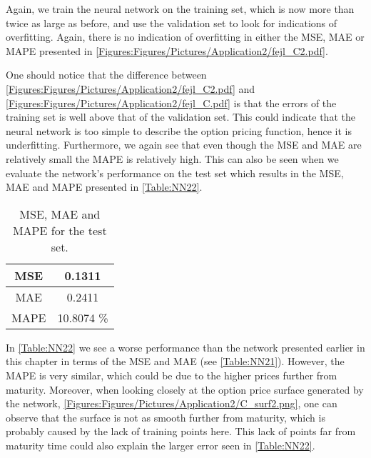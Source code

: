 Again, we train the neural network on the training set, which is now more than twice as large as before, and use the validation set to look for indications of overfitting. Again, there is no indication of overfitting in either the MSE, MAE or MAPE presented in \autoref{Figures:Figures/Pictures/Application2/fejl_C2.pdf}.


One should notice that the difference between \autoref{Figures:Figures/Pictures/Application2/fejl_C2.pdf} and \autoref{Figures:Figures/Pictures/Application2/fejl_C.pdf} is that the errors of the training set is well above that of the validation set. This could indicate that the neural network is too simple to describe the option pricing function, hence it is underfitting. Furthermore, we again see that even though the MSE and MAE are relatively small the MAPE is relatively high. This can also be seen when we evaluate the network's performance on the test set which results in the MSE, MAE and MAPE presented in \autoref{Table:NN22}.

\begin{table}[H]
    \centering
    {\renewcommand{\arraystretch}{1.25}\begin{tabular}{c|c}
        MSE  &  0.1311\\ \hline
        MAE  &  0.2411\\ \hline
        MAPE &  10.8074  \%\\ 
    \end{tabular}}
    \caption{MSE, MAE and MAPE for the test set.}
    \label{Table:NN22}
\end{table}

In \autoref{Table:NN22} we see a worse performance than the network presented earlier in this chapter in terms of the MSE and MAE (see \autoref{Table:NN21}). However, the MAPE is very similar, which could be due to the higher prices further from maturity. Moreover, when looking closely at the option price surface generated by the network, \autoref{Figures:Figures/Pictures/Application2/C_surf2.png}, one can observe that the surface is not as smooth further from maturity, which is probably caused by the lack of training points here. This lack of points far from maturity time could also explain the larger error seen in \autoref{Table:NN22}.



